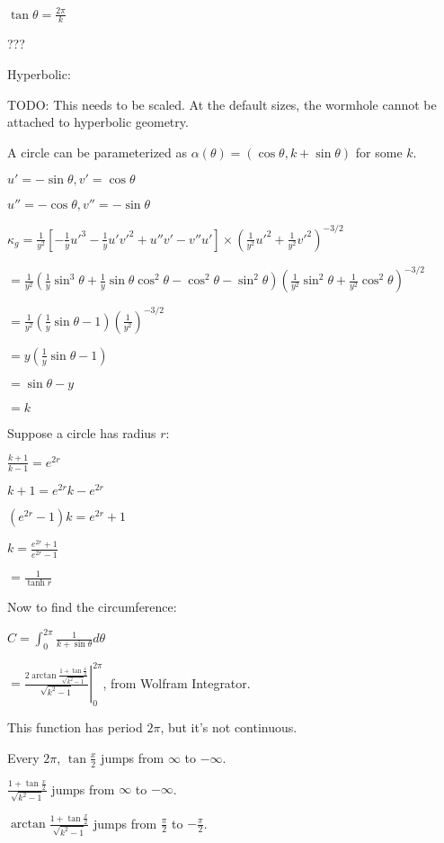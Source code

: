 \documentclass[12pt]{amsart}
\begin{document}
$\tan\theta = \frac{2\pi}{k}$

???

Hyperbolic:

TODO: This needs to be scaled. At the default sizes, the wormhole cannot be attached to hyperbolic geometry.

A circle can be parameterized as $\alpha(\theta) = (\cos \theta, k + \sin \theta)$ for some $k$.

$u' = -\sin\theta, v' = \cos\theta$

$u'' = -\cos\theta, v'' = -\sin\theta$

$\kappa_g = \frac{1}{y^2}[-\frac{1}{y}u'^3 - \frac{1}{y}u'v'^2 + u''v' - v''u'] \times (\frac{1}{y^2}u'^2 + \frac{1}{y^2}v'^2)^{-3/2}$

$= \frac{1}{y^2}\left(\frac{1}{y}\sin^3\theta + \frac{1}{y}\sin\theta\cos^2\theta - \cos^2\theta - \sin^2\theta\right)\left(\frac{1}{y^2}\sin^2\theta + \frac{1}{y^2}\cos^2\theta\right)^{-3/2}$

$= \frac{1}{y^2}\left(\frac{1}{y}\sin\theta - 1\right)\left(\frac{1}{y^2}\right)^{-3/2}$

$= y\left(\frac{1}{y}\sin\theta - 1\right)$

$= \sin\theta - y$

$= k$

Suppose a circle has radius $r$:

$\frac{k+1}{k-1} = e^{2r}$

$k+1 = e^{2r}k-e^{2r}$

$(e^{2r}-1)k = e^{2r}+1$

$k = \frac{e^{2r}+1}{e^{2r}-1}$

$= \frac{1}{\tanh r}$

Now to find the circumference:

$C = \int_0^{2\pi} \frac{1}{k+\sin\theta} d\theta$


$= \left.\frac{2\arctan \frac{1 + \tan\frac{x}{2}}{\sqrt{k^2-1}}}{\sqrt{k^2-1}}\right|_0^{2\pi}$, from Wolfram Integrator.

This function has period $2\pi$, but it's not continuous.

Every $2\pi$, $\tan\frac{x}{2}$ jumps from $\infty$ to $-\infty$.

$\frac{1 + \tan\frac{x}{2}}{\sqrt{k^2-1}}$ jumps from $\infty$ to $-\infty$.

$\arctan \frac{1 + \tan\frac{x}{2}}{\sqrt{k^2-1}}$ jumps from $\frac{\pi}{2}$ to $-\frac{\pi}{2}$.
\end{document}
